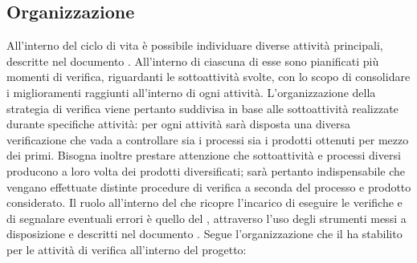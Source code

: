 \documentclass[a4paper, titlepage]{article}
\begin{document}
\subsection{Organizzazione}
All’interno del ciclo di vita è possibile individuare diverse attività principali, descritte nel documento . All’interno di ciascuna di esse sono pianificati più momenti di verifica, riguardanti le sottoattività svolte, con lo scopo di consolidare i miglioramenti raggiunti all'interno di ogni attività.
\newline L’organizzazione della strategia di verifica viene pertanto suddivisa in base alle sottoattività realizzate durante specifiche attività: per ogni attività sarà disposta una diversa verificazione che vada a controllare sia i processi sia i prodotti ottenuti per mezzo dei primi. Bisogna inoltre prestare attenzione che sottoattività e processi diversi producono a loro volta dei prodotti diversificati; sarà pertanto indispensabile che vengano effettuate distinte procedure di verifica a seconda del processo e prodotto considerato.
\newline Il ruolo all'interno del  che ricopre l'incarico di eseguire le verifiche e di segnalare eventuali errori è quello del , attraverso l'uso degli strumenti messi a disposizione e descritti nel documento .
\newline Segue l'organizzazione che il  ha stabilito per le attività di verifica all'interno del progetto:
\\
\end{document}
